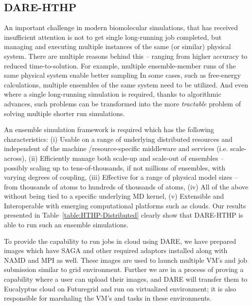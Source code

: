 \documentclass{sig-alternate}
\begin{document}
\subsection{DARE-HTHP}

An important challenge in modern biomolecular simulations, that has
received insufficient attention is not to get single long-running job
completed, but managing and executing multiple instances of the same
(or similar) physical system.  There are multiple reasons behind this
-- ranging from higher accuracy to reduced time-to-solution. For
example, multiple ensemble-member runs of the same physical system
enable better sampling In some cases, such as free-energy
calculations, multiple ensembles of the same system need to be
utilized. And even where a single long-running simulation is required,
thanks to algorithmic advances, such problems can be transformed into
the more {\it tractable} problem of solving multiple shorter run
simulations.



An ensemble simulation framework is required which has the following
characteristics: (i) Usable on a range of underlying distributed
resources and independent of the machine /resource-specific middleware
and services (i.e. scale-across), (ii) Efficiently manage both
scale-up and scale-out of ensembles -- possibly scaling up to
tens-of-thousands, if not millions of ensembles, with varying degrees
of coupling, (iii) Effective for a range of physical model sizes --
from thousands of atoms to hundreds of thousands of atoms, (iv) All of
the above without being tied to a specific underlying MD kernel, (v)
Extensible and Interoperable with emerging computational platforms
such as clouds.  Our results presented in
Table~\ref{table:HTHP-Distributed} clearly show that  DARE-HTHP is
able to run such an ensemble simulations.



To provide the capability to run jobs in cloud using DARE, we have
prepared images which have SAGA and other required adaptors installed
along with NAMD and MPI as well.  These images are used to launch
multiple VM's and job submission similar to grid environment. Further
we are in a process of proving a capability where a user can upload
their images, and DARE will transfer them to Eucalyptus cloud on
Futuregrid and run on virtualized environment; it is also responsible
for marshaling the VM's and tasks in these environments.
\end{document}

